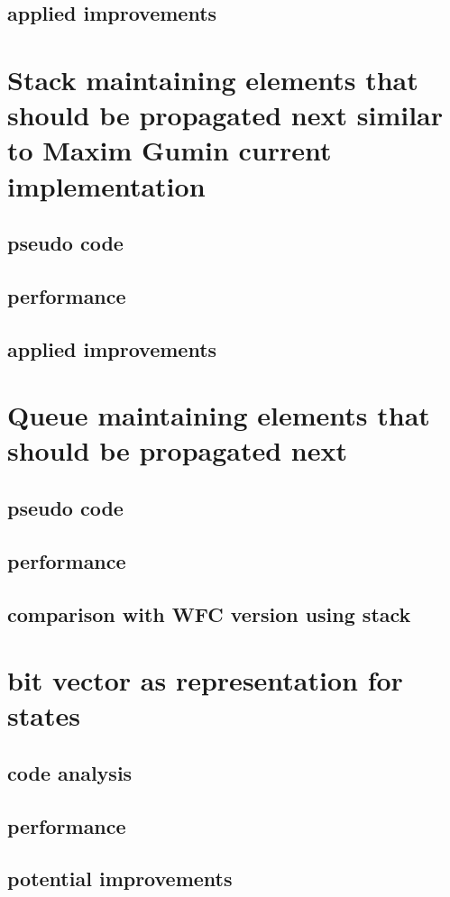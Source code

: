 \documentclass[shortabstract, english, inz]{iithesis}
\begin{document}
        \subsection{applied improvements}
    \section{Stack maintaining elements that should be propagated next \fmlinebreak similar to Maxim Gumin current implementation}
        \subsection{pseudo code}
        \subsection{performance}
        \subsection{applied improvements}
    \section{Queue maintaining elements that should be propagated next}
        \subsection{pseudo code}
        \subsection{performance}
        \subsection{comparison with WFC version using stack}
    \section{bit vector as representation for states}
        \label{bitwise}
        \subsection{code analysis}
        \subsection{performance}
        \subsection{potential improvements}
\end{document}
